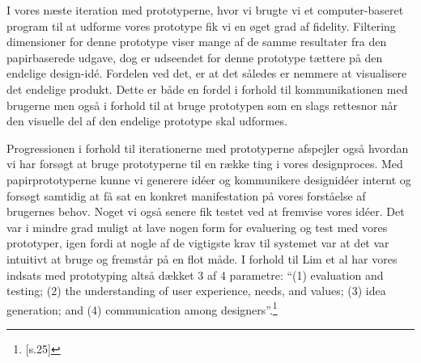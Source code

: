 I vores næste iteration med prototyperne, hvor vi brugte vi et computer-baseret program til at udforme vores prototype fik vi en øget grad af fidelity. Filtering dimensioner for denne prototype viser mange af de samme resultater fra den papirbaserede udgave, dog er udseendet for denne prototype tættere på den endelige design-idé. Fordelen ved det, er at det således er nemmere at visualisere det endelige produkt. Dette er både en fordel i forhold til kommunikationen med brugerne men også i forhold til at bruge prototypen som en slags rettesnor når den visuelle del af den endelige prototype skal udformes. 

Progressionen i forhold til iterationerne med prototyperne afspejler også hvordan vi har forsøgt at bruge prototyperne til en række ting i vores designproces. Med papirprototyperne kunne vi generere idéer og kommunikere designidéer internt og forsøgt samtidig at få sat en konkret manifestation på vores forståelse af brugernes behov. Noget vi også senere fik testet ved at fremvise vores idéer. Det var i mindre grad muligt at lave nogen form for evaluering og test med vores prototyper, igen fordi at nogle af de vigtigste krav til systemet var at det var intuitivt at bruge og fremstår på en flot måde. I forhold til Lim et al har vores indsats med prototyping altså dækket 3 af 4 parametre: “(1) evaluation and testing; (2) the understanding of user experience, needs, and values; (3) idea generation; and (4) communication among designers”.\footnote{\citep{Lim}[s.25]}
